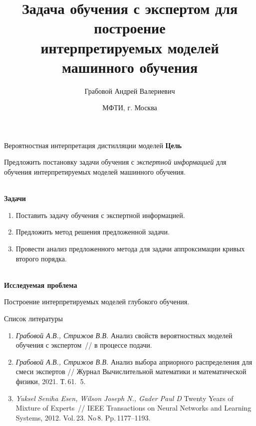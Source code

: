 \documentclass[10pt,pdf,hyperref={unicode}]{beamer}
\title[\hbox to 56mm{Обучение с экспетом\hfill\insertframenumber\,/\,\inserttotalframenumber}]
{Задача обучения с экспертом для построение\\ интерпретируемых моделей машинного обучения}
\author[А.\,В.~Грабовой]{\large Грабовой Андрей Валериевич}
\institute{\large
Московский физико-технический институт}
\date{\footnotesize{МФТИ, г. Москва}}
\begin{document}
\begin{frame}
\titlepage
\end{frame}

\begin{frame}{Вероятностная интерпретация дистилляции моделей}
\justifying
\textbf{Цель}

Предложить постановку задачи обучения с \textit{экспертной информацией} для обучения интерпретируемых моделей машинного обучения. 

~\\
\textbf{Задачи}

\begin{enumerate}
\justifying
	\item Поставить задачу обучения с экспертной информацией.
	\item Предложить метод решения предложенной задачи.
	\item Провести анализ предложенного метода для задачи аппроксимации кривых второго порядка.
\end{enumerate}

~\\
\textbf{Исследуемая проблема}

Построение интерпретируемых моделей глубокого обучения.

\end{frame}

\begin{frame}{Список литературы}
\justifying
\begin{enumerate}
	\item \textit{Грабовой А.В., Стрижов В.В.} Анализ свойств вероятностных моделей обучения с экспертом~// в процессе подачи.
	\item \textit{Грабовой А.В., Стрижов В.В.} Анализ выбора априорного распределения для смеси экспертов // Журнал Вычислительной математики и математической физики, 2021. Т.\,61. \textnumero\,5.
	\item \textit{Yuksel Seniha Esen, Wilson Joseph N., Gader Paul D} Twenty Years of Mixture of Experts~// IEEE Transactions on Neural Networks and Learning Systems, 2012. Vol.\,23. No\,8. Pp.\,1177--1193.
\end{enumerate}
\end{frame}
\end{document}
